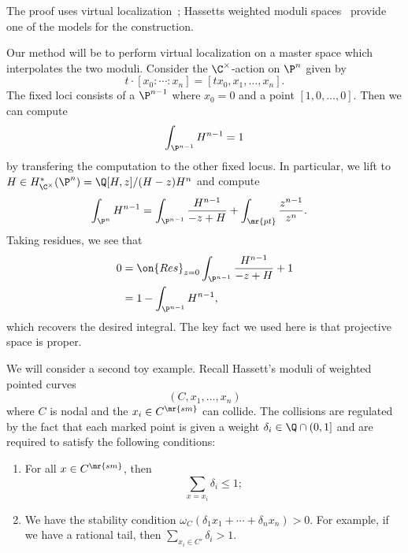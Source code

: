 The proof uses virtual localization~\cite{GP1999}; Hassett\textquotesingle s weighted moduli spaces~\cite{Hassett2003} provide one of the models for the construction.

Our method will be to perform virtual localization on a master space which interpolates the two moduli. Consider the \(\C^{\times}\)-action on \(\P^n\) given by
\[ t \cdot [x_0 : \cdots : x_n] = [t x_0, x_1, \ldots, x_n]. \]
The fixed loci consists of a \(\P^{n-1}\) where \(x_0 = 0\) and a point \([1, 0, \ldots, 0]\). Then we can compute
\[ \int_{\P^{n-1}} H^{n-1} = 1 \]
by transfering the computation to the other fixed locus. In particular, we lift to \(H \in H_{\C^{\times}}^* (\P^n) = \Q[H,z] / (H-z)H^n\) and compute
\begin{align*}
    \int_{\P^n} H^{n-1} &= \int_{\P^{n-1}} \frac{H^{n-1}}{-z+H} + \int_{\mr{pt}} \frac{z^{n-1}}{z^n}.
\end{align*}
Taking residues, we see that
\begin{align*}
    0 &= \on{Res}_{z = 0}\int_{\P^{n-1}} \frac{H^{n-1}}{-z+H} + 1 \\
    &= 1 - \int_{\P^{n-1}}H^{n-1},
\end{align*}
which recovers the desired integral. The key fact we used here is that projective space is proper.

\begin{exm}
    We will consider a second toy example. Recall Hassett's moduli of weighted pointed curves
    \[ (C, x_1, \ldots, x_n) \]
    where \(C\) is nodal and the \(x_i \in C^{\mr{sm}}\) can collide. The collisions are regulated by the fact that each marked point is given a weight \(\delta_i \in \Q \cap (0,1]\) and are required to satisfy the following conditions:
    \begin{enumerate}
        \item For all \(x \in C^{\mr{sm}}\), then
            \[ \sum_{x = x_i} \delta_i \leq 1; \]
        \item We have the stability condition \(\omega_C(\delta_1 x_1 + \cdots + \delta_n x_n) > 0\). For example, if we have a rational tail, then \(\sum_{x_i \in C'} \delta_i > 1\).
    \end{enumerate}
\end{exm}

